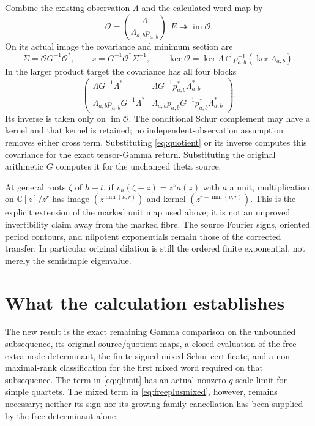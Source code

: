 \documentclass[11pt,a4paper]{article}
\newcommand{\C}{\mathbb C}
\newcommand{\im}{\operatorname{im}}
\begin{document}
Combine the existing observation $\Lambda$ and the calculated word map by
\begin{equation}
 \mathcal O=\binom{\Lambda}{\Lambda_{a,b}p_{a,b}}:
 E\twoheadrightarrow\im\mathcal O.
\end{equation}
On its actual image the covariance and minimum section are
\begin{equation}
 \Sigma=\mathcal O G^{-1}\mathcal O^*,\qquad
 s=G^{-1}\mathcal O^*\Sigma^{-1},\qquad
 \ker\mathcal O=\ker\Lambda\cap p_{a,b}^{-1}(\ker\Lambda_{a,b}).
\end{equation}
In the larger product target the covariance has all four blocks
\begin{equation}
 \begin{pmatrix}
 \Lambda G^{-1}\Lambda^*&\Lambda G^{-1}p_{a,b}^*\Lambda_{a,b}^*\\
 \Lambda_{a,b}p_{a,b}G^{-1}\Lambda^*&
 \Lambda_{a,b}p_{a,b}G^{-1}p_{a,b}^*\Lambda_{a,b}^*
 \end{pmatrix}.
\end{equation}
Its inverse is taken only on $\im\mathcal O$. The conditional Schur complement may have a kernel and that kernel is retained; no independent-observation assumption removes either cross term. Substituting \eqref{eq:quotient} or its inverse computes this covariance for the exact tensor-Gamma return. Substituting the original arithmetic $G$ computes it for the unchanged theta source.

At general roots $\zeta$ of $h-t$, if $v_h(\zeta+z)=z^\nu a(z)$ with $a$ a unit, multiplication on $\C[z]/z^r$ has image $(z^{\min(\nu,r)})$ and kernel $(z^{r-\min(\nu,r)})$. This is the explicit extension of the marked unit map used above; it is not an unproved invertibility claim away from the marked fibre. The source Fourier signs, oriented period contours, and nilpotent exponentials remain those of the corrected transfer. In particular original dilation is still the ordered finite exponential, not merely the semisimple eigenvalue.

\section{What the calculation establishes}
The new result is the exact remaining Gamma comparison on the unbounded subsequence, its original source/quotient maps, a closed evaluation of the free extra-node determinant, the finite signed mixed-Schur certificate, and a non-maximal-rank classification for the first mixed word required on that subsequence. The term in \eqref{eq:qlimit} has an actual nonzero $q$-scale limit for simple quartets. The mixed term in \eqref{eq:freeplusmixed}, however, remains necessary; neither its sign nor its growing-family cancellation has been supplied by the free determinant alone.
\end{document}
